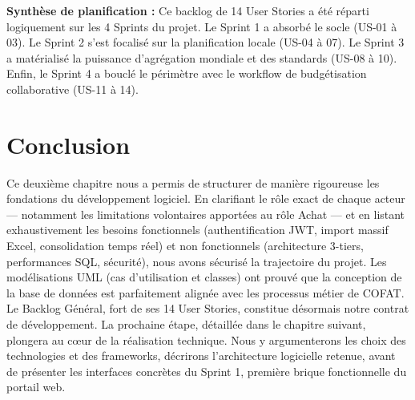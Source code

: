 \textbf{Synthèse de planification :} Ce backlog de 14 User Stories a été réparti logiquement sur les 4 Sprints du projet. Le Sprint 1 a absorbé le socle (US-01 à 03). Le Sprint 2 s'est focalisé sur la planification locale (US-04 à 07). Le Sprint 3 a matérialisé la puissance d'agrégation mondiale et des standards (US-08 à 10). Enfin, le Sprint 4 a bouclé le périmètre avec le workflow de budgétisation collaborative (US-11 à 14).

\section{Conclusion}
Ce deuxième chapitre nous a permis de structurer de manière rigoureuse les fondations du développement logiciel. En clarifiant le rôle exact de chaque acteur — notamment les limitations volontaires apportées au rôle Achat — et en listant exhaustivement les besoins fonctionnels (authentification JWT, import massif Excel, consolidation temps réel) et non fonctionnels (architecture 3-tiers, performances SQL, sécurité), nous avons sécurisé la trajectoire du projet. Les modélisations UML (cas d'utilisation et classes) ont prouvé que la conception de la base de données est parfaitement alignée avec les processus métier de COFAT. Le Backlog Général, fort de ses 14 User Stories, constitue désormais notre contrat de développement.
La prochaine étape, détaillée dans le chapitre suivant, plongera au cœur de la réalisation technique. Nous y argumenterons les choix des technologies et des frameworks, décrirons l'architecture logicielle retenue, avant de présenter les interfaces concrètes du Sprint 1, première brique fonctionnelle du portail web.
